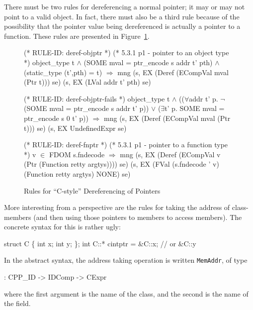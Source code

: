 \documentclass[11pt]{article}
\begin{document}
There must be two rules for dereferencing a normal pointer; it may or
may not point to a valid object.  In fact, there must also be a third
rule because of the possibility that the pointer value being
dereferenced is actually a pointer to a function. These rules are presented in
Figure~\ref{fig:deref-rules}.
\begin{figure}[htbp]
%
%
%
%
\begin{stdrule}
(* RULE-ID: deref-objptr *)
(* 5.3.1 p1 - pointer to an object type *)
     object_type t \(\land\)
     (SOME mval = ptr_encode s addr t' pth) \(\land\)
     (static_type (t',pth) = t)
   \(\Rightarrow\)
     mng (s, EX (Deref (ECompVal mval (Ptr t))) se)
         (s, EX (LVal addr t' pth) se)


(* RULE-ID: deref-objptr-fails *)
     object_type t \(\land\)
     ((\(\forall\)addr t' p. \(\neg\)(SOME mval = ptr_encode s addr t' p)) \(\lor\)
      (\(\exists\)t' p. SOME mval = ptr_encode s 0 t' p))
   \(\Rightarrow\)
     mng (s, EX (Deref (ECompVal mval (Ptr t))) se)
         (s, EX UndefinedExpr se)


(* RULE-ID: deref-fnptr *)
(* 5.3.1 p1 - pointer to a function type *)
     v \(\in\) FDOM s.fndecode
   \(\Rightarrow\)
     mng (s, EX (Deref
                  (ECompVal v
                            (Ptr (Function retty argtys))))
                se)
         (s, EX (FVal (s.fndecode ' v)
                      (Function retty argtys)
                      NONE) se)
\end{stdrule}
\caption{Rules for ``C-style'' Dereferencing of Pointers}
\label{fig:deref-rules}
\end{figure}

\medskip
\noindent More interesting from a \cpp{} perspective are the rules for
taking the address of class-members (and then using those pointers to
members to access members).  The concrete syntax for this is
rather ugly:
\begin{stdrule}
   struct C \{ int x; int y; \};
   int C::* cintptr = &C::x; // or &C::y
\end{stdrule}
%
In the abstract syntax, the address taking operation is written
\texttt{MemAddr}, of type
\begin{stdrule}
   : CPP_ID -> IDComp -> CExpr
\end{stdrule}
where the first argument is the name of the class, and the second is
the name of the field.
\end{document}
